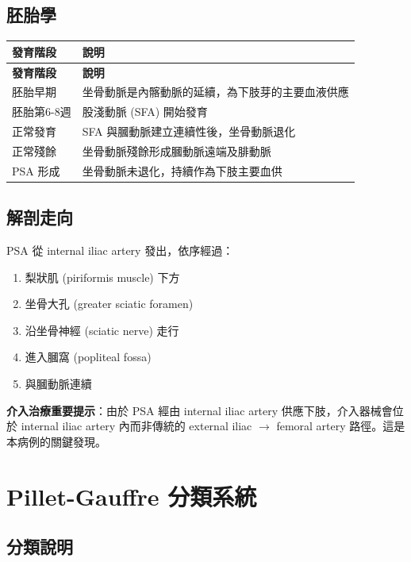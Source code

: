 \documentclass[12pt,a4paper]{article}
\newcommand{\note}[1]{
    \par
    \noindent
    \begin{tcolorbox}[
        colback=emergency_blue!5!white,
        colframe=emergency_blue,
        title=\textbf{重點提醒},
        fonttitle=\bfseries,
        boxrule=0.5pt,
        arc=3pt,
        left=6pt,
        right=6pt,
        top=6pt,
        bottom=6pt
    ]
    #1
    \end{tcolorbox}
}
\begin{document}
\subsection{胚胎學}

\begin{longtable}{p{4cm}p{10cm}}
\toprule
\textbf{發育階段} & \textbf{說明} \\
\midrule
\endfirsthead
\toprule
\textbf{發育階段} & \textbf{說明} \\
\midrule
\endhead
\bottomrule
\endlastfoot
胚胎早期 & 坐骨動脈是內髂動脈的延續，為下肢芽的主要血液供應 \\
\midrule
胚胎第6-8週 & 股淺動脈 (SFA) 開始發育 \\
\midrule
正常發育 & SFA 與膕動脈建立連續性後，坐骨動脈退化 \\
\midrule
正常殘餘 & 坐骨動脈殘餘形成膕動脈遠端及腓動脈 \\
\midrule
PSA 形成 & 坐骨動脈未退化，持續作為下肢主要血供 \\
\end{longtable}

\subsection{解剖走向}

PSA 從 internal iliac artery 發出，依序經過：
\begin{enumerate}
    \item 梨狀肌 (piriformis muscle) 下方
    \item 坐骨大孔 (greater sciatic foramen)
    \item 沿坐骨神經 (sciatic nerve) 走行
    \item 進入膕窩 (popliteal fossa)
    \item 與膕動脈連續
\end{enumerate}

\note{
\textbf{介入治療重要提示}：由於 PSA 經由 internal iliac artery 供應下肢，介入器械會位於 internal iliac artery 內而非傳統的 external iliac $\rightarrow$ femoral artery 路徑。這是本病例的關鍵發現。
}

\section{Pillet-Gauffre 分類系統}

\subsection{分類說明}
\end{document}
